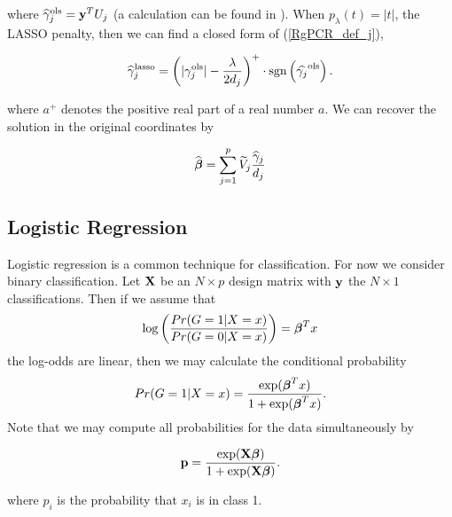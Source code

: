 \documentclass[main.tex]{subfiles}
\begin{document}
where $\widehat{\gamma}^{\text{ols}}_j = \mathbf{y}^T U_j$ (a calculation can be found in \cite{langzou}). When $p_{\lambda}(t) = |t|$, the LASSO penalty, then we can find a closed form of (\ref{RgPCR_def_j}),

\begin{align}
	\widehat{\gamma}_j^{\text{lasso}} = \left ( |\gamma_j^{\text{ols}}| - \frac{\lambda}{2d_j} \right )^+ \cdot \text{sgn} \left ( \widehat{\gamma_j}^{\text{ols}} \right ).
\end{align}

where $a^+$ denotes the positive real part of a real number $a$. We can recover the solution in the original coordinates by

\begin{align}
	\widehat{\boldsymbol \beta} = \sum_{j = 1}^p \widetilde{V}_j \frac{\widehat{\gamma}_j}{d_j}
\end{align}

%
%
%
%
%
%
%
%
%
%
%

\subsection{Logistic Regression}
Logistic regression is a common technique for classification. For now we consider binary classification. Let $\mathbf{X}$ be an $N \times p$ design matrix with $\mathbf{y}$ the $N \times 1$ classifications. Then if we assume that
\begin{align}
    \log \left ( \dfrac{Pr(G = 1 | X = x)}{Pr(G = 0|X = x)}\right ) = \boldsymbol \beta^Tx \label{log-odds}
\end{align}
the log-odds are linear, then we may calculate the conditional probability
\begin{align}
    Pr(G = 1 | X = x) = \dfrac{\text{exp}(\boldsymbol \beta^Tx)}{1 + \text{exp}(\boldsymbol \beta^Tx)}.
\end{align}
Note that we may compute all probabilities for the data simultaneously by

\begin{align}
	\mathbf{p} = \dfrac{\text{exp}(\mathbf{X} \boldsymbol \beta)}{1 + \text{exp}(\mathbf{X} \boldsymbol \beta)}.
\end{align}

where $p_i$ is the probability that $x_i$ is in class 1.
\end{document}
